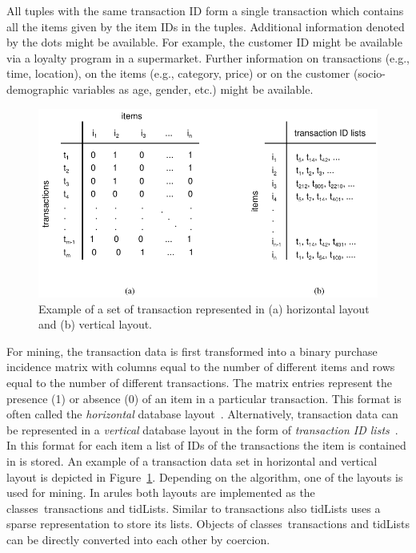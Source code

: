 \documentclass[10pt,a4paper]{article}
\newcommand{\strong}[1]{{\normalfont\fontseries{b}\selectfont #1}}
\newcommand{\class}[1]{\textsf{#1}}
\newcommand{\pkg}[1]{\strong{#1}}
\begin{document}
All tuples with the same transaction ID form a single transaction which
contains all the items given by the item IDs in the tuples.  Additional
information denoted by the dots might be available.  For example, the
customer ID might be available via a loyalty program in a supermarket.
Further information on transactions (e.g., time, location), on the items
(e.g., category, price) or on the customer (socio-demographic variables
as age, gender, etc.)  might be available.

\begin{figure}[tp]
\centering
\includegraphics[width=12cm]{transactionMatrix}
\caption{Example of a set of transaction represented in 
    (a) horizontal layout and (b) vertical layout.\label{fig:transactionMatrix}}
\end{figure}

For mining, the transaction data is first transformed into a binary purchase
incidence matrix with columns equal to the number of different items and rows
equal to the number of different transactions.  The matrix entries represent
the presence (1) or absence (0) of an item in a particular transaction.  This
format is often called the \emph{horizontal} database
layout~\citep{arules:Zaki:2000}.  Alternatively, transaction data can be
represented in a \emph{vertical} database layout in the form of
\emph{transaction ID lists}~\citep{arules:Zaki:2000}.  In this format for each
item a list of IDs of the transactions the item is contained in is stored.  An
example of a transaction data set in horizontal and vertical layout is
depicted in Figure~\ref{fig:transactionMatrix}.  Depending on the algorithm,
one of the layouts is used for mining.  In \pkg{arules} both layouts are
implemented as the classes~\class{transactions} and \class{tidLists}.
Similar to \class{transactions} also \class{tidLists} uses a
sparse representation to store its lists. 
Objects of classes~\class{transactions} and \class{tidLists}
can be directly converted into each other by coercion.
\end{document}
